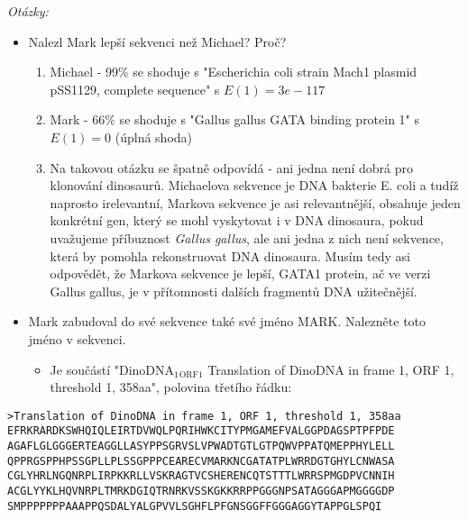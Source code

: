 \documentclass[11pt]{article}
\begin{document}
\emph{Otázky:}
\begin{itemize}
\item Nalezl Mark lepší sekvenci než Michael? Proč?
\begin{enumerate}
\item Michael - 99\% se shoduje s "Escherichia coli strain Mach1 plasmid pSS1129, complete
sequence" s \(E(1) = 3e-117\)
\item Mark - 66\% se shoduje s "Gallus gallus GATA binding protein 1" s \(E(1) = 0\) (úplná shoda)
\item Na takovou otázku se špatně odpovídá - ani jedna není dobrá pro klonování
dinosaurů. Michaelova sekvence je DNA bakterie E. coli a tudíž naprosto
irelevantní, Markova sekvence je asi relevantnější, obsahuje jeden
konkrétní gen, který se mohl vyskytovat i v DNA dinosaura, pokud uvažujeme
příbuznost \emph{Gallus gallus}, ale ani jedna z nich není sekvence, která by
pomohla rekonstruovat DNA dinosaura. Musím tedy asi odpovědět, že Markova
sekvence je lepší, GATA1 protein, ač ve verzi Gallus gallus, je v
přítomnosti dalších fragmentů DNA užitečnější.
\end{enumerate}
\item Mark zabudoval do své sekvence také své jméno MARK. Nalezněte toto jméno v
sekvenci.
\begin{itemize}
\item Je součástí "DinoDNA\(_{\text{1}}\)\(_{\text{ORF1}}\)  Translation of DinoDNA in frame 1, ORF 1,
threshold 1, 358aa", polovina třetího řádku:
\end{itemize}
\end{itemize}
\begin{verbatim}
>Translation of DinoDNA in frame 1, ORF 1, threshold 1, 358aa
EFRKRARDKSWHQIQLEIRTDVWQLPQRIHWKCITYPMGAMEFVALGGPDAGSPTPFPDE
AGAFLGLGGGERTEAGGLLASYPPSGRVSLVPWADTGTLGTPQWVPPATQMEPPHYLELL
QPPRGSPPHPSSGPLLPLSSGPPPCEARECVMARKNCGATATPLWRRDGTGHYLCNWASA
CGLYHRLNGQNRPLIRPKKRLLVSKRAGTVCSHERENCQTSTTTLWRRSPMGDPVCNNIH
ACGLYYKLHQVNRPLTMRKDGIQTRNRKVSSKGKKRRPPGGGNPSATAGGGAPMGGGGDP
SMPPPPPPPAAAPPQSDALYALGPVVLSGHFLPFGNSGGFFGGGAGGYTAPPGLSPQI
\end{verbatim}
\end{document}
